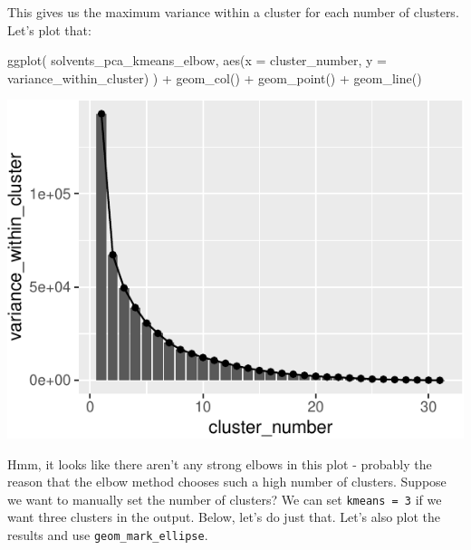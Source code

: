 \documentclass[
]{krantz}
\newenvironment{Shaded}{\begin{snugshade}}{\end{snugshade}}
\newcommand{\AttributeTok}[1]{\textcolor[rgb]{0.77,0.63,0.00}{#1}}
\newcommand{\FunctionTok}[1]{\textcolor[rgb]{0.00,0.00,0.00}{#1}}
\newcommand{\NormalTok}[1]{#1}
\newcommand{\SpecialCharTok}[1]{\textcolor[rgb]{0.00,0.00,0.00}{#1}}
\begin{document}
This gives us the maximum variance within a cluster for each number of clusters. Let's plot that:

\begin{Shaded}
\begin{Highlighting}[]
\FunctionTok{ggplot}\NormalTok{(}
\NormalTok{  solvents\_pca\_kmeans\_elbow,}
  \FunctionTok{aes}\NormalTok{(}\AttributeTok{x =}\NormalTok{ cluster\_number, }\AttributeTok{y =}\NormalTok{ variance\_within\_cluster)}
\NormalTok{) }\SpecialCharTok{+}
  \FunctionTok{geom\_col}\NormalTok{() }\SpecialCharTok{+}
  \FunctionTok{geom\_point}\NormalTok{() }\SpecialCharTok{+}
  \FunctionTok{geom\_line}\NormalTok{()}
\end{Highlighting}
\end{Shaded}

\begin{center}\includegraphics{index_files/figure-latex/unnamed-chunk-106-1} \end{center}

Hmm, it looks like there aren't any strong elbows in this plot - probably the reason that the elbow method chooses such a high number of clusters. Suppose we want to manually set the number of clusters? We can set \texttt{kmeans\ =\ 3} if we want three clusters in the output. Below, let's do just that. Let's also plot the results and use \texttt{geom\_mark\_ellipse}.
\end{document}
